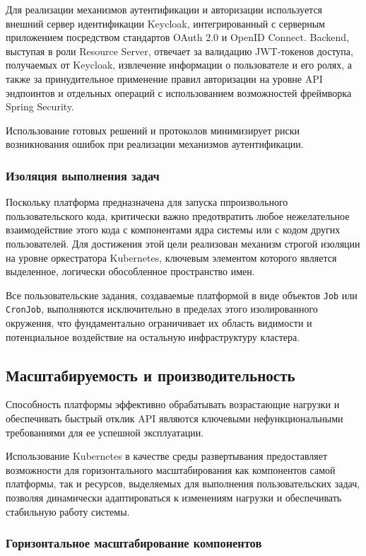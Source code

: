 Для реализации механизмов аутентификации и авторизации используется внешний сервер идентификации Keycloak, интегрированный с серверным приложением посредством стандартов OAuth 2.0 и OpenID Connect. Backend, выступая в роли Resource Server, отвечает за валидацию JWT-токенов доступа, получаемых от Keycloak, извлечение информации о пользователе и его ролях, а также за принудительное применение правил авторизации на уровне API эндпоинтов и отдельных операций с использованием возможностей фреймворка Spring Security.

Использование готовых решений и протоколов минимизирует риски возникнования ошибок при реализации механизмов аутентификации.

\subsubsection{Изоляция выполнения задач}

Поскольку платформа предназначена для запуска ппроизвольного пользовательского кода, критически важно предотвратить любое нежелательное взаимодействие этого кода с компонентами ядра системы или с кодом других пользователей. Для достижения этой цели реализован механизм строгой изоляции на уровне оркестратора Kubernetes, ключевым элементом которого является выделенное, логически обособленное пространство имен.

Все пользовательские задания, создаваемые платформой в виде объектов \texttt{Job} или \texttt{CronJob}, выполняются исключительно в пределах этого изолированного окружения, что фундаментально ограничивает их область видимости и потенциальное воздействие на остальную инфраструктуру кластера.

\subsection{Масштабируемость и производительность}

Способность платформы эффективно обрабатывать возрастающие нагрузки и обеспечивать быстрый отклик API являются ключевыми нефункциональными требованиями для ее успешной эксплуатации.

Использование Kubernetes в качестве среды развертывания предоставляет возможности для горизонтального масштабирования как компонентов самой платформы, так и ресурсов, выделяемых для выполнения пользовательских задач, позволяя динамически адаптироваться к изменениям нагрузки и обеспечивать стабильную работу системы.

\subsubsection{Горизонтальное масштабирование компонентов}

